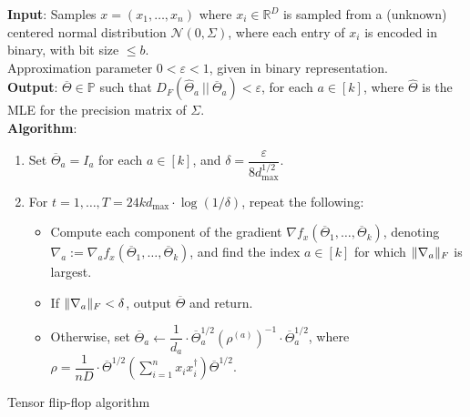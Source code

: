 \documentclass[aos]{imsart}
\theoremstyle{definition}
\numberwithin{equation}{section}
\DeclarePairedDelimiter{\norm}{\lVert}{\rVert}
\newcommand{\R}{{\mathbb{R}}}
\newcommand{\otheta}{\overline{\Theta}}
\newcommand{\htheta}{\widehat{\Theta}}
\newcommand{\eps}{\varepsilon}
\newcommand{\cN}{\mathcal{N}}
\newcommand{\SPD}{\mathbb{P}}
\newcommand{\samp}{x}
\def\dmax{d_{\max}}
\begin{document}
\begin{Algorithm}
\textbf{Input}: Samples $\samp = (\samp_1, \ldots, \samp_n)$ where $\samp_i \in \R^D$ is sampled from a (unknown) centered normal distribution $\cN(0, \Sigma)$, where each entry of $\samp_i$ is encoded in binary, with bit size $\le b$. \\ Approximation parameter $0 < \eps < 1$, given in binary representation. \\[.3ex]

\textbf{Output}: $\otheta \in \SPD$ such that $D_F(\htheta_a \ || \ \otheta_a) < \eps$, for each $a \in [k]$, where $\htheta$ is the MLE for the precision matrix of $\Sigma$. \\[.3ex]

\textbf{Algorithm}:
\begin{enumerate}
\item\label{it:tensor-flip-flop step 1} Set $\otheta_a = I_a$ for each $a \in [k]$, and 
$\delta = \dfrac{\eps}{8 \dmax^{1/2}}$. 

\vspace{5pt}

\item\label{it:tensor-flip-flop step 2} For $t=1,\dots,T = 24 k \dmax \cdot \log(1/\delta)$, repeat the following:

\vspace{5pt}

\begin{itemize}
\item Compute each component of the gradient $\nabla f_{\samp}(\otheta_1, \ldots, \otheta_k)$, denoting $\nabla_a := \nabla_a f_{\samp}(\otheta_1, \ldots, \otheta_k)$, and find the index $a \in [k]$ for which $\norm{\nabla_a}_F$ is largest.

\vspace{5pt}

\item
If $\norm{\nabla_a}_F < \delta$, output $\otheta$ and return.

\vspace{5pt}

\item Otherwise, set $\otheta_a \leftarrow  \dfrac{1}{d_a} \cdot \otheta_a^{1/2} (\rho^{(a)})^{-1} \cdot \otheta_a^{1/2}$, where $\rho = \dfrac{1}{nD} \cdot \otheta^{1/2} \left( \sum_{i=1}^n x_ix_i^\dagger \right) \otheta^{1/2}.$
\end{itemize}
\end{enumerate}
\caption{Tensor flip-flop algorithm}\label{alg:tensor-flip-flop}
\end{Algorithm}
\end{document}

